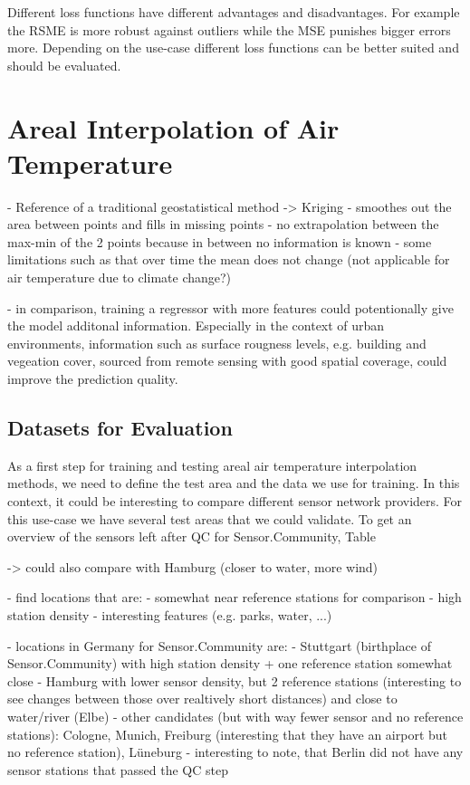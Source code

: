 Different loss functions have different advantages and disadvantages. For example the RSME is more robust against outliers while the MSE punishes bigger errors more. Depending on the use-case different loss functions can be better suited and should be evaluated.

\section{Areal Interpolation of Air Temperature}

- Reference of a traditional geostatistical method -> Kriging
  - smoothes out the area between points and fills in missing points
  - no extrapolation between the max-min of the 2 points because in between no information is known
  - some limitations such as that over time the mean does not change (not applicable for air temperature due to climate change?)

- in comparison, training a regressor with more features could potentionally give the model additonal information. Especially in the context of urban environments, information such as surface rougness levels, e.g. building and vegeation cover, sourced from remote sensing with good spatial coverage, could improve the prediction quality.

\subsection{Datasets for Evaluation}

As a first step for training and testing areal air temperature interpolation methods, we need to define the test area and the data we use for training. In this context, it could be interesting to compare different sensor network providers.
For this use-case we have several test areas that we could validate. To get an overview of the sensors left after QC for Sensor.Community, Table 

-> could also compare with Hamburg (closer to water, more wind)

- find locations that are:
  - somewhat near reference stations for comparison
  - high station density
  - interesting features (e.g. parks, water, ...)

- locations in Germany for Sensor.Community are:
  - Stuttgart (birthplace of Sensor.Community) with high station density + one reference station somewhat close
  - Hamburg with lower sensor density, but 2 reference stations (interesting to see changes between those over realtively short distances) and close to water/river (Elbe)
  - other candidates (but with way fewer sensor and no reference stations): Cologne, Munich, Freiburg (interesting that they have an airport but no reference station), Lüneburg
  - interesting to note, that Berlin did not have any sensor stations that passed the QC step\\

